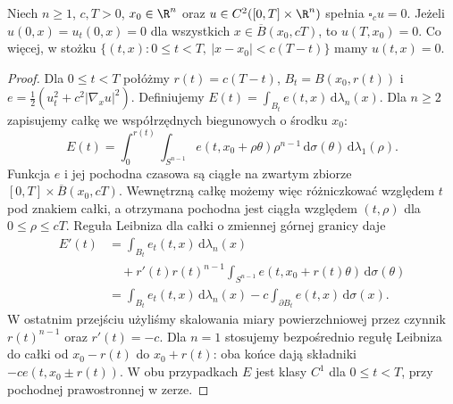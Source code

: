 \begin{twierdzenie}
\label{thm:pde5-cone}
Niech $n\ge1$, $c,T>0$, $x_0\in\R^n$ oraz
$u\in C^2([0,T]\times\R^n)$ spełnia $\square_cu=0$.
Jeżeli $u(0,x)=u_t(0,x)=0$ dla wszystkich
$x\in\overline B(x_0,cT)$, to $u(T,x_0)=0$.
Co więcej, w stożku
$\{(t,x):0\le t<T,\ |x-x_0|<c(T-t)\}$
mamy $u(t,x)=0$.
\end{twierdzenie}
\begin{proof}
Dla $0\le t<T$ połóżmy $r(t)=c(T-t)$,
$B_t=B(x_0,r(t))$ i
$e=\frac12(u_t^2+c^2|\nabla_xu|^2)$. Definiujemy
$E(t)=\int_{B_t}e(t,x)\,\mathrm d\lambda_n(x)$.
Dla $n\geq2$ zapisujemy całkę we współrzędnych
biegunowych o środku $x_0$:
\[
 E(t)=\int_0^{r(t)}\!\int_{S^{n-1}}
 e(t,x_0+\rho\theta)\rho^{n-1}\,
 \mathrm d\sigma(\theta)\,\mathrm d\lambda_1(\rho).
\]
Funkcja $e$ i jej pochodna czasowa są ciągłe
na zwartym zbiorze
$[0,T]\times\overline B(x_0,cT)$.
Wewnętrzną całkę możemy więc różniczkować
względem $t$ pod znakiem całki, a otrzymana
pochodna jest ciągła względem $(t,\rho)$
dla $0\leq\rho\leq cT$. Reguła Leibniza dla całki
o zmiennej górnej granicy daje
\[
 \begin{aligned}
 E'(t)
 &=\int_{B_t}e_t(t,x)\,\mathrm d\lambda_n(x)\\
 &\quad+r'(t)r(t)^{n-1}
     \int_{S^{n-1}}e(t,x_0+r(t)\theta)
       \,\mathrm d\sigma(\theta)\\
 &=\int_{B_t}e_t(t,x)\,\mathrm d\lambda_n(x)
    -c\int_{\partial B_t}e(t,x)\,\mathrm d\sigma(x).
 \end{aligned}
\]
W ostatnim przejściu użyliśmy skalowania miary
powierzchniowej przez czynnik $r(t)^{n-1}$
oraz $r'(t)=-c$.
Dla $n=1$ stosujemy bezpośrednio regułę Leibniza
do całki od $x_0-r(t)$ do $x_0+r(t)$: oba
końce dają składniki $-ce(t,x_0\pm r(t))$.
W obu przypadkach $E$ jest klasy $C^1$ dla
$0\leq t<T$, przy pochodnej prawostronnej w zerze.


\end{proof}
